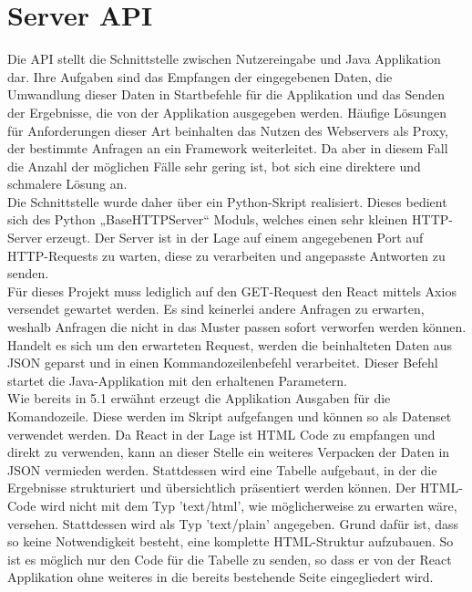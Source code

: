 \section{Server API}
Die API stellt die Schnittstelle zwischen Nutzereingabe und Java Applikation dar. Ihre Aufgaben sind das Empfangen der eingegebenen Daten, die Umwandlung dieser Daten in Startbefehle für die Applikation und das Senden der Ergebnisse, die von der Applikation ausgegeben werden. Häufige Lösungen für Anforderungen dieser Art beinhalten das Nutzen des Webservers als Proxy, der bestimmte Anfragen an ein Framework weiterleitet. Da aber in diesem Fall die Anzahl der möglichen Fälle sehr gering ist, bot sich eine direktere und schmalere Lösung an.\\
Die Schnittstelle wurde daher über ein Python-Skript realisiert. Dieses bedient sich des Python „BaseHTTPServer“ Moduls, welches einen sehr kleinen HTTP-Server erzeugt. Der Server ist in der Lage auf einem angegebenen Port auf HTTP-Requests zu warten, diese zu verarbeiten und angepasste Antworten zu senden. \\
Für dieses Projekt muss lediglich auf den GET-Request den React mittels Axios versendet gewartet werden. Es sind keinerlei andere Anfragen zu erwarten, weshalb Anfragen die nicht in das Muster passen sofort verworfen werden können.\\
Handelt es sich um den erwarteten Request, werden die beinhalteten Daten aus JSON geparst und in einen Kommandozeilenbefehl verarbeitet. Dieser Befehl startet die Java-Applikation mit den erhaltenen Parametern.\\
Wie bereits in 5.1 erwähnt erzeugt die Applikation Ausgaben für die Komandozeile. Diese werden im Skript aufgefangen und können so als Datenset verwendet werden. Da React in der Lage ist HTML Code zu empfangen und direkt zu verwenden, kann an dieser Stelle ein weiteres Verpacken der Daten in JSON vermieden werden. Stattdessen wird eine Tabelle aufgebaut, in der die Ergebnisse strukturiert und übersichtlich präsentiert werden können. Der HTML-Code wird nicht mit dem Typ 'text/html', wie möglicherweise zu erwarten wäre, versehen. Stattdessen wird als Typ 'text/plain' angegeben. Grund dafür ist, dass so keine Notwendigkeit besteht, eine komplette HTML-Struktur aufzubauen. So ist es möglich nur den Code für die Tabelle zu senden, so dass er von der React Applikation ohne weiteres in die bereits bestehende Seite eingegliedert wird.

